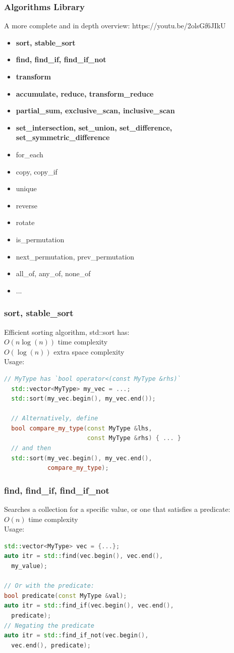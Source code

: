 \documentclass{beamer}
\begin{document}
\begin{frame}
  \frametitle{Algorithms Library}
  A more complete and in depth overview: https://youtu.be/2olsGf6JIkU
  \begin{itemize}
    \item {\bf sort, stable\_sort}
    \item {\bf find, find\_if, find\_if\_not}
    \item {\bf transform}
    \item {\bf accumulate, reduce, transform\_reduce}
    \item {\bf partial\_sum, exclusive\_scan, inclusive\_scan}
    \item {\bf set\_intersection, set\_union, set\_difference, set\_symmetric\_difference}
    \item for\_each
    \item copy, copy\_if
    \item unique
    \item reverse
    \item rotate
    \item is\_permutation
    \item next\_permutation, prev\_permutation
    \item all\_of, any\_of, none\_of
    \item ...
  \end{itemize}
\end{frame}

\begin{frame}[fragile]
  \frametitle{sort, stable\_sort}
  Efficient sorting algorithm, std::sort has:\\
  $O(n \log(n))$ time complexity\\
  $O(\log(n))$ extra space complexity\\
  Usage:
  \begin{lstlisting}[language=C++]
  // MyType has `bool operator<(const MyType &rhs)`
  std::vector<MyType> my_vec = ...;
  std::sort(my_vec.begin(), my_vec.end());

  // Alternatively, define
  bool compare_my_type(const MyType &lhs,
                       const MyType &rhs) { ... }
  // and then
  std::sort(my_vec.begin(), my_vec.end(),
            compare_my_type);
  \end{lstlisting}
\end{frame}

\begin{frame}[fragile]
  \frametitle{find, find\_if, find\_if\_not}
  Searches a collection for a specific value, or one that satisfies a predicate:\\
  $O(n)$ time complexity\\
  Usage:
  \begin{lstlisting}[language=C++]
std::vector<MyType> vec = {...};
auto itr = std::find(vec.begin(), vec.end(),
  my_value);

// Or with the predicate:
bool predicate(const MyType &val);
auto itr = std::find_if(vec.begin(), vec.end(),
  predicate);
// Negating the predicate
auto itr = std::find_if_not(vec.begin(),
  vec.end(), predicate);
  \end{lstlisting}
\end{frame}
\end{document}

